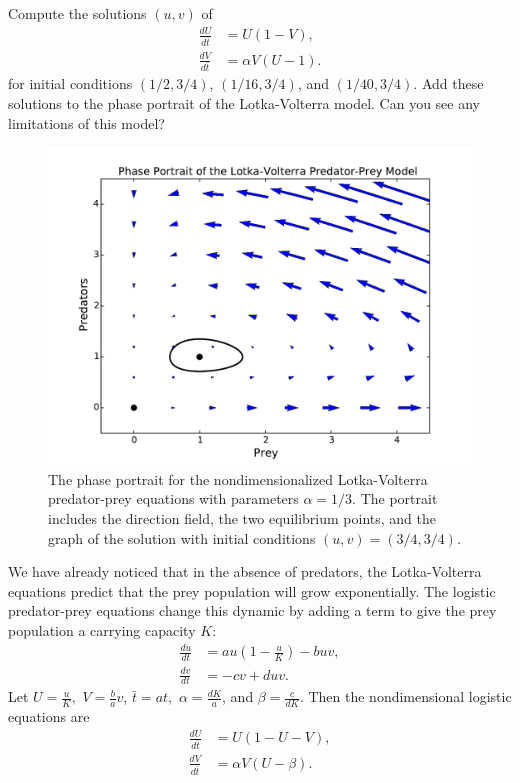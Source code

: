 \begin{problem}
	Compute the solutions $(u,v)$ of 
	\begin{align*}
		\frac{dU}{d\bar{t}} &= U(1-V),\\
		\frac{dV}{d\bar{t}} &= \alpha V (U-1).
	\end{align*}
	for initial conditions $(1/2, 3/4)$, $(1/16, 3/4)$, and $(1/40, 3/4)$.
	Add these solutions to the phase portrait of the Lotka-Volterra model.
	Can you see any limitations of this model? 
\end{problem}




\begin{figure}[ht]
\centering
\includegraphics[width=\textwidth]{Lotka_Volterra_Phase_Portrait.pdf}
\caption{The phase portrait for the nondimensionalized Lotka-Volterra 
predator-prey equations with parameters $\alpha = 1/3$. 
The portrait includes the direction field, the two equilibrium points, 
and the graph of the solution with initial conditions $(u,v) = (3/4, 3/4)$. }
\label{pred-prey:Lotka_Voterra_Phase_Portrait}
\end{figure}

We have already noticed that in the absence of predators, the Lotka-Volterra 
equations predict that the prey population will grow exponentially. The logistic 
predator-prey equations change this dynamic by adding a term to give the prey 
population a carrying capacity $K$: 
\begin{align*}
	\frac{du}{dt} &= au\left(1 -\frac{u}{K}\right) - buv,\\
	\frac{dv}{dt} &= -cv + duv.
\end{align*}
Let $U = \frac{u}{K},$ $V = \frac{b}{a}v$, $\bar{t} = at,$  
$\alpha = \frac{dK}{a}$, and $\beta = \frac{c}{dK}$. Then the nondimensional logistic
equations are 
\begin{align*}
	\frac{dU}{d\bar{t}} &= U(1-U-V),\\
	\frac{dV}{d\bar{t}} &= \alpha V (U-\beta).
\end{align*}


